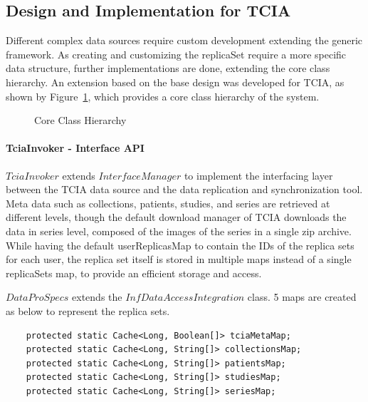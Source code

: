 \documentclass[conference]{IEEEtran}
\begin{document}
\subsection{Design and Implementation for TCIA}
Different complex data sources require custom development extending the generic framework. As creating and customizing the replicaSet require a more specific data structure, further implementations are done, extending the core class hierarchy. An extension based on the base design was developed for TCIA, as shown by Figure~\ref{fig:class}, which provides a core class hierarchy of the system.
\begin{figure}[b]
\begin{center}
\end{center}
 \caption{Core Class Hierarchy}
 \label{fig:class}
\end{figure}

\paragraph*{TciaInvoker - Interface API}
$TciaInvoker$ extends $InterfaceManager$ to implement the interfacing layer between the TCIA data source and the data replication and synchronization tool. Meta data such as collections, patients, studies, and series are retrieved at different levels, though the default download manager of TCIA downloads the data in series level, composed of the images of the series in a single zip archive. While having the default userReplicasMap to contain the IDs of the replica sets for each user, the replica set itself is stored in multiple maps instead of a single replicaSets map, to provide an efficient storage and access.

$DataProSpecs$ extends the $InfDataAccessIntegration$ class. 5 maps are created as below to represent the replica sets.
\begin{lstlisting}  
    protected static Cache<Long, Boolean[]> tciaMetaMap;
    protected static Cache<Long, String[]> collectionsMap;
    protected static Cache<Long, String[]> patientsMap;
    protected static Cache<Long, String[]> studiesMap;
    protected static Cache<Long, String[]> seriesMap;
\end{lstlisting} 
\end{document}
